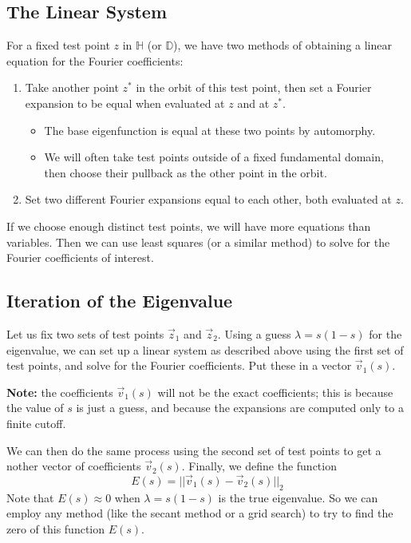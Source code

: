 \documentclass[]{article}
\begin{document}
\subsection*{The Linear System}

For a fixed test point $z$ in $\mathbb{H}$ (or $\mathbb{D}$), we have two methods of obtaining a linear equation for the Fourier coefficients:
\begin{enumerate}
	\item Take another point $z^*$ in the orbit of this test point, then set a Fourier expansion to be equal when evaluated at $z$ and at $z^*$.
	\begin{itemize}
		\item The base eigenfunction is equal at these two points by automorphy.
		\item We will often take test points outside of a fixed fundamental domain, then choose their pullback as the other point in the orbit.
	\end{itemize}
	\item Set two different Fourier expansions equal to each other, both evaluated at $z$.
\end{enumerate}
If we choose enough distinct test points, we will have more equations than variables.
Then we can use least squares (or a similar method) to solve for the Fourier coefficients of interest.

\subsection*{Iteration of the Eigenvalue}

Let us fix two sets of test points $\vec{z}_1$ and $\vec{z}_2$.
Using a guess $\lambda = s(1 - s)$ for the eigenvalue, we can set up a linear system as described above using the first set of test points, and solve for the Fourier coefficients.
Put these in a vector $\vec{v}_1(s)$.

\textbf{Note:} the coefficients $\vec{v}_1(s)$ will not be the exact coefficients; this is because the value of $s$ is just a guess, and because the expansions are computed only to a finite cutoff.

We can then do the same process using the second set of test points to get a nother vector of coefficients $\vec{v}_2(s)$.
Finally, we define the function
$$
E(s) = ||\vec{v}_1(s) - \vec{v}_2(s)||_2
$$
Note that $E(s) \approx 0$ when $\lambda = s(1 - s)$ is the true eigenvalue.
So we can employ any method (like the secant method or a grid search) to try to find the zero of this function $E(s)$.
\end{document}

